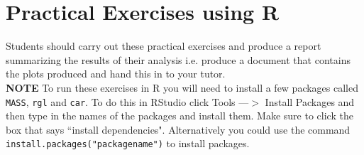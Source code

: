 \documentclass[answers]{exam}
\begin{document}
\section*{Practical Exercises using R}
Students should carry out these practical exercises and produce a report summarizing the results of their analysis i.e. produce a document that contains the plots produced and hand this in to your tutor.\\
\textbf{NOTE} To run these exercises in R you will need to install a few packages called \texttt{MASS}, \texttt{rgl} and \texttt{car}. To do this in RStudio click Tools ---$>$ Install Packages and then type in the names of the packages and install them. Make sure to click the box that says ``install dependencies". Alternatively you could use the command \texttt{install.packages("packagename")} to install packages.
\end{document}
